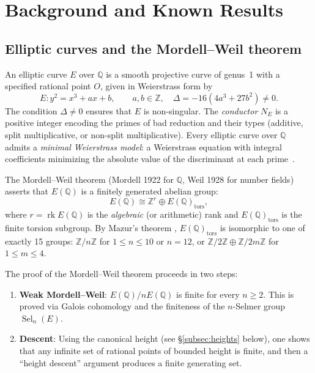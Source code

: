 \documentclass[11pt]{article}
\DeclareMathOperator{\rk}{rk}
\DeclareMathOperator{\Sel}{Sel}
\begin{document}
\section{Background and Known Results}
\label{sec:background}

\subsection{Elliptic curves and the Mordell--Weil theorem}

An elliptic curve $E$ over $\mathbb{Q}$ is a smooth projective curve of genus~1
with a specified rational point $O$, given in Weierstrass form by
\[
  E : y^2 = x^3 + ax + b, \qquad a,b \in \mathbb{Z}, \quad
  \Delta = -16(4a^3 + 27b^2) \neq 0.
\]
The condition $\Delta \neq 0$ ensures that $E$ is non-singular.  The
\emph{conductor} $N_E$ is a positive integer encoding the primes of bad
reduction and their types (additive, split multiplicative, or non-split
multiplicative).  Every elliptic curve over $\mathbb{Q}$ admits a
\emph{minimal Weierstrass model}: a Weierstrass equation with integral
coefficients minimizing the absolute value of the discriminant at each
prime~\cite{SilvI}.

The Mordell--Weil theorem (Mordell 1922 for $\mathbb{Q}$, Weil 1928 for
number fields) asserts that $E(\mathbb{Q})$ is a finitely generated
abelian group:
\[
  E(\mathbb{Q}) \cong \mathbb{Z}^r \oplus E(\mathbb{Q})_{\mathrm{tors}},
\]
where $r = \rk E(\mathbb{Q})$ is the \emph{algebraic} (or arithmetic) rank
and $E(\mathbb{Q})_{\mathrm{tors}}$ is the finite torsion subgroup.  By
Mazur's theorem \cite{Mazur}, $E(\mathbb{Q})_{\mathrm{tors}}$ is isomorphic
to one of exactly 15 groups: $\mathbb{Z}/n\mathbb{Z}$ for
$1 \leq n \leq 10$ or $n = 12$, or $\mathbb{Z}/2\mathbb{Z} \oplus
\mathbb{Z}/2m\mathbb{Z}$ for $1 \leq m \leq 4$.

The proof of the Mordell--Weil theorem proceeds in two steps:
\begin{enumerate}
  \item \textbf{Weak Mordell--Weil}: $E(\mathbb{Q})/nE(\mathbb{Q})$ is finite
    for every $n \geq 2$.  This is proved via Galois cohomology and the
    finiteness of the $n$-Selmer group $\Sel_n(E)$.
  \item \textbf{Descent}: Using the canonical height (see
    \S\ref{subsec:heights} below), one shows that any infinite set of
    rational points of bounded height is finite, and then a
    ``height descent'' argument produces a finite generating set.
\end{enumerate}
\end{document}
